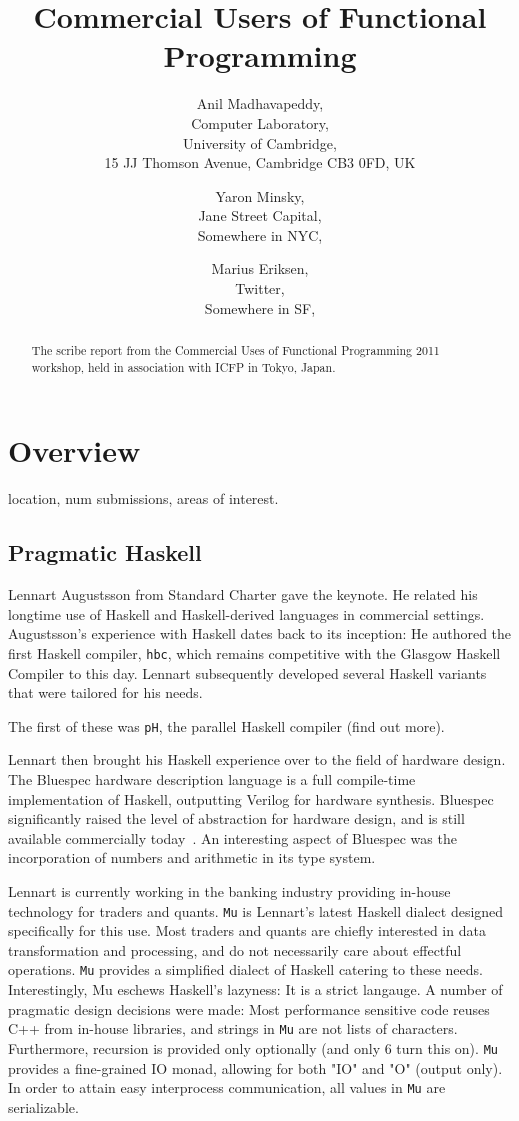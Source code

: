 \documentclass{jfp1}
\title[Commercial Users of Functional Programming 2011]{Commercial Users of Functional Programming}
\author[Anil Madhavapeddy]
       {Anil Madhavapeddy,\\
        Computer Laboratory,\\
        University of Cambridge,\\ 
        15 JJ Thomson Avenue, Cambridge CB3 0FD, UK\\
        \email{avsm2@cl.cam.ac.uk}}
\author[Yaron Minsky]
       {Yaron Minsky,\\
        Jane Street Capital,\\
        Somewhere in NYC,\\ 
        \email{yminsky@gmail.com}}
\author[Marius Eriksen]
       {Marius Eriksen,\\
        Twitter,\\
        Somewhere in SF,\\ 
        \email{marius@twitter.com}}
\begin{document}
\label{firstpage}

\maketitle

\begin{abstract}
The scribe report from the Commercial Uses of Functional Programming 2011 workshop, held in association with ICFP in Tokyo, Japan.
\end{abstract}


\section{Overview}

location, num submissions, areas of interest. 

\subsection{Pragmatic Haskell}

Lennart Augustsson from Standard Charter gave the keynote. He related his 
longtime use of Haskell and Haskell-derived languages in commercial settings.
Augustsson's experience with Haskell dates back to its inception: He authored 
the first Haskell compiler, {\tt hbc}, which remains competitive with the Glasgow 
Haskell Compiler to this day. Lennart subsequently developed several Haskell 
variants that were tailored for his needs.

The first of these was {\tt pH}, the parallel Haskell compiler (find out more).

Lennart then brought his Haskell experience over to the field of
hardware design.  The Bluespec hardware description language is a full
compile-time implementation of Haskell, outputting Verilog for
hardware synthesis.  Bluespec significantly raised the level of
abstraction for hardware design, and is still available commercially
today~\cite{bluespec}.  An interesting aspect of Bluespec was the
incorporation of numbers and arithmetic in its type system.

Lennart is currently working in the banking industry providing
in-house technology for traders and quants.  {\tt Mu} is Lennart's
latest Haskell dialect designed specifically for this use.  Most
traders and quants are chiefly interested in data transformation and
processing, and do not necessarily care about effectful operations.
{\tt Mu} provides a simplified dialect of Haskell catering to these
needs.  Interestingly, Mu eschews Haskell's lazyness: It is a strict
langauge.  A number of pragmatic design decisions were made: Most
performance sensitive code reuses C++ from in-house libraries, and
strings in {\tt Mu} are not lists of characters.  Furthermore,
recursion is provided only optionally (and only 6%
turn this on).  {\tt Mu} provides a fine-grained IO monad, allowing
for both "IO" and "O" (output only).  In order to attain easy
interprocess communication, all values in {\tt Mu} are serializable.
\end{document}
